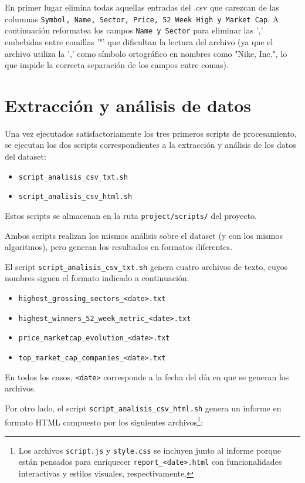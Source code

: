 \documentclass[11pt,a4paper]{article}
\begin{document}
En primer lugar elimina todas aquellas entradas del .csv que carezcan de las columnas \texttt{Symbol, Name, Sector, Price, 52 Week High y Market Cap}. A continuación reformatea los campos \texttt{Name y Sector} para eliminar las ',' embebidas entre comillas '"'  que dificultan la lectura del archivo (ya que el archivo utiliza la ',' como símbolo ortográfico en nombres como "Nike, Inc.", lo que impide la correcta separación de los campos entre comas).

\section{Extracción y análisis de datos}

Una vez ejecutados satisfactoriamente los tres primeros scripts de procesamiento, se ejecutan los dos scripts correspondientes a la extracción y análisis de los datos del dataset:

\begin{itemize}[noitemsep]
\item \texttt{script\_analisis\_csv\_txt.sh}
\item \texttt{script\_analisis\_csv\_html.sh}
\end{itemize}

Estos scripts se almacenan en la ruta \texttt{project/scripts/} del proyecto.

Ambos scripts realizan los mismos análisis sobre el dataset (y con los mismos algoritmos), pero generan los resultados en formatos diferentes.

El script \texttt{script\_analisis\_csv\_txt.sh} genera cuatro archivos de texto, cuyos nombres siguen el formato indicado a continuación:

\begin{itemize}[noitemsep]
\item \texttt{highest\_grossing\_sectors\_<date>.txt}
\item \texttt{highest\_winners\_52\_week\_metric\_<date>.txt}
\item \texttt{price\_marketcap\_evolution\_<date>.txt}
\item \texttt{top\_market\_cap\_companies\_<date>.txt}
\end{itemize}

En todos los casos, \texttt{<date>} corresponde a la fecha del día en que se generan los archivos.

Por otro lado, el script \texttt{script\_analisis\_csv\_html.sh} genera un informe en formato HTML compuesto por los siguientes archivos\footnote{Los archivos \texttt{script.js} y \texttt{style.css} se incluyen junto al informe porque están pensados para enriquecer \texttt{report\_<date>.html} con funcionalidades interactivas y estilos visuales, respectivamente.}:
\end{document}
